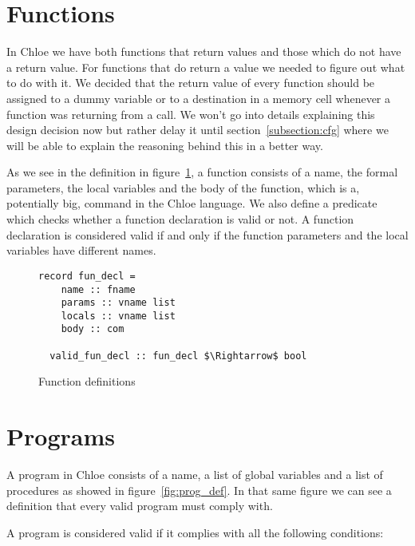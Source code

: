 \section{Functions}\label{section:functions_commands}

In Chloe we have both functions that return values and those which do not have a return value.
For functions that do return a value we needed to figure out what to do with it.
We decided that the return value of every function should be assigned to a dummy variable or to a destination in a memory cell whenever a function was returning from a call.
We won't go into details explaining this design decision now but rather delay it until section~\ref{subsection:cfg} where we will be able to explain the reasoning behind this in a better way.

As we see in the definition in figure~\ref{fig:fun_def}, a function consists of a name, the formal parameters, the local variables and the body of the function, which is a, potentially big, command in the Chloe language.
We also define a predicate which checks whether a function declaration is valid or not.
A function declaration is considered valid if and only if the function parameters and the local variables have different names.

\begin{figure}
  \begin{lstlisting}[frame=single, mathescape=true]
  record fun_decl =
    name :: fname
    params :: vname list
    locals :: vname list
    body :: com

  valid_fun_decl :: fun_decl $\Rightarrow$ bool
  \end{lstlisting}

  \caption{Function definitions}
  \label{fig:fun_def}
\end{figure}

\section{Programs}\label{section:programs_commands}

A program in Chloe consists of a name, a list of global variables and a list of procedures as showed in figure~\ref{fig:prog_def}.
In that same figure we can see a definition that every valid program must comply with.

A program is considered valid if it complies with all the following conditions:

